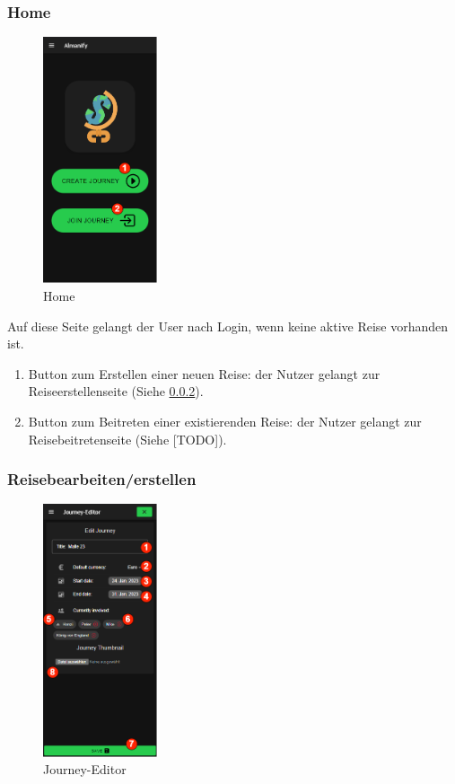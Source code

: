\subsubsection{Home}\label{Home}
\begin{figure}[H]
	\centering
	\includegraphics[width=0.3\textwidth]{img/pages_numbers/home.drawio}
	\caption[Home]{Home}
	\label{fig:Home}
\end{figure}

Auf diese Seite gelangt der User nach Login, wenn keine aktive Reise vorhanden ist.

\begin{enumerate}[label=\protect\circled{\arabic*}]
	\item Button zum Erstellen einer neuen Reise: der Nutzer gelangt zur Reiseerstellenseite (Siehe \ref{Journey-Editor}).
	\item Button zum Beitreten einer existierenden Reise: der Nutzer gelangt zur Reisebeitretenseite (Siehe [TODO]).
\end{enumerate}

\subsubsection{Reisebearbeiten/erstellen}\label{Journey-Editor}
\begin{figure}[H]
	\centering
	\includegraphics[width=0.3\textwidth]{img/pages_numbers/journey-editor.drawio}
	\caption[Journey-Editor]{Journey-Editor}
	\label{fig:Journey-Editor}
\end{figure}

